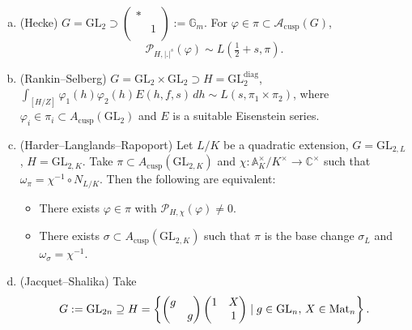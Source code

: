 \documentclass[reqno]{amsart} 
\begin{document}
\begin{example}\label{example:cq6tho6g4r}
  \begin{enumerate}[(a)]
  \item (Hecke) $G = \mathrm{GL}_2 \supset \left(
      \begin{smallmatrix}
        \ast&\\
         &1 \\
      \end{smallmatrix}
    \right) := \mathbb{G}_m$.  For $\varphi \in \pi \subset \mathcal{A}_{\mathrm{cusp}}(G)$,
    \begin{equation*}
      \mathcal{P}_{H, \lvert . \rvert^s}(\varphi) \sim L(\tfrac{1}{2} + s, \pi).
    \end{equation*}
  \item (Rankin--Selberg) $G = \mathrm{GL}_2 \times \mathrm{GL}_2 \supset H = \mathrm{GL}_2^{\mathrm{diag}}$, $\int_{[H/Z]} \varphi_1(h) \varphi_2(h) E(h, f, s) \, d h \sim L(s, \pi_1 \times \pi_2)$, where $\varphi_i \in \pi_i \subset A_{\mathrm{cusp}}(\mathrm{GL}_2)$ and $E$ is a suitable Eisenstein series.
  \item (Harder--Langlands--Rapoport) Let $L/K$ be a quadratic extension, $G =\mathrm{GL}_{2, L}$, $H =\mathrm{GL}_{2, K}$.  Take $\pi \subset A_{\mathrm{cusp}}(\mathrm{GL}_{2, K})$ and $\chi : \mathbb{A}_K^\times / K^\times \rightarrow \mathbb{C}^\times$ such that $\omega_\pi = \chi^{-1} \circ N_{L/K}$.  Then the following are equivalent:
    \begin{itemize}
    \item There exists $\varphi \in \pi$ with $\mathcal{P}_{H, \chi}(\varphi) \neq 0$.
    \item There exists $\sigma \subset A_{\mathrm{cusp}}(\mathrm{GL}_{2, K})$ such that $\pi$ is the base change $\sigma_L$ and $\omega_\sigma = \chi^{-1}$.
    \end{itemize}
  \item (Jacquet--Shalika)
    Take
    \begin{equation*}
      G :=\mathrm{GL}_{2 n} \supseteq H = \left\{
        \begin{pmatrix}
          g &  \\
            & g \\
        \end{pmatrix}
        \begin{pmatrix}
          1          & X \\
                     & 1 \\
        \end{pmatrix} \mid g \in \mathrm{GL}_n, \, X \in \Mat_n \right\}.

\end{equation*}
\end{enumerate}
\end{example}
\end{document}
